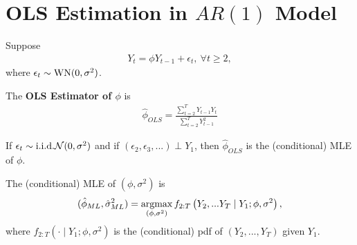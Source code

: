 \documentclass[11pt]{elegantbook}
\newcommand{\argmax}{\operatornamewithlimits{argmax}}
\begin{document}
\section{OLS Estimation in $AR(1)$ Model}
Suppose
\begin{equation}
    \begin{aligned}
        Y_t=\phi Y_{t-1}+\epsilon_t,\ \forall t\geq 2,
    \end{aligned}
    \nonumber
\end{equation}
where $\epsilon_t\sim \textnormal{WN}(0,\sigma^2)$.

The \textbf{OLS Estimator of $\phi$} is
\begin{equation}
    \begin{aligned}
        \hat{\phi}_{OLS}=\frac{\sum_{t=2}^TY_{t-1}Y_t}{\sum_{t=2}^T Y_{t-1}^2}
    \end{aligned}
    \nonumber
\end{equation}

\begin{claim}
    If $\epsilon_t\sim \textnormal{i.i.d.} \mathcal{N}(0,\sigma^2)$ and if $(\epsilon_2,\epsilon_3,...)\perp Y_1$, then $\hat{\phi}_{OLS}$ is the (conditional) MLE of $\phi$.
\end{claim}
The (conditional) MLE of $(\phi,\sigma^2)$ is
\begin{equation}
    \begin{aligned}
        (\hat{\phi}_{ML},\hat{\sigma}^2_{ML})=\argmax_{(\phi,\sigma^2)} f_{2:T}\left(Y_2,...Y_T\mid Y_1;\phi,\sigma^2\right),
    \end{aligned}
    \nonumber
\end{equation}
where $f_{2:T}(\cdot\mid Y_1; \phi,\sigma^2)$ is the (conditional) pdf of $(Y_2,...,Y_T)$ given $Y_1$.
\end{document}
